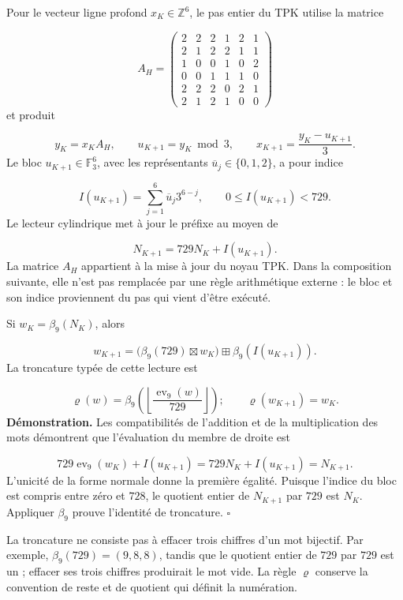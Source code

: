 Pour le vecteur ligne profond \(x_K\in\mathbb Z^6\), le pas entier du TPK utilise la matrice

\[
A_H=
\begin{pmatrix}
2&2&2&1&2&1\\
2&1&2&2&1&1\\
1&0&0&1&0&2\\
0&0&1&1&1&0\\
2&2&2&0&2&1\\
2&1&2&1&0&0
\end{pmatrix}
\]
et produit

\[
y_K=x_KA_H,\qquad
u_{K+1}=y_K\bmod3,\qquad
x_{K+1}=\frac{y_K-u_{K+1}}3.
\]
Le bloc \(u_{K+1}\in\mathbb F_3^6\), avec les représentants \(\overline u_j\in\{0,1,2\}\), a pour indice

\[
I(u_{K+1})=\sum_{j=1}^{6}\overline u_j3^{6-j},
\qquad 0\leq I(u_{K+1})<729.
\]
Le lecteur cylindrique met à jour le préfixe au moyen de

\[
N_{K+1}=729N_K+I(u_{K+1}).
\]
La matrice \(A_H\) appartient à la mise à jour du noyau TPK. Dans la composition suivante, elle n'est pas remplacée par une règle arithmétique externe : le bloc et son indice proviennent du pas qui vient d'être exécuté.

Si \(w_K=\beta_9(N_K)\), alors

\[
w_{K+1}
=\bigl(\beta_9(729)\boxtimes w_K\bigr)
\boxplus\beta_9(I(u_{K+1})).
\]
La troncature typée de cette lecture est

\[
\varrho(w)=
\beta_9\!\left(
\left\lfloor\frac{\operatorname{ev}_9(w)}{729}\right\rfloor
\right);
\qquad \varrho(w_{K+1})=w_K.
\]
\textbf{Démonstration.} Les compatibilités de l'addition et de la multiplication des mots démontrent que l'évaluation du membre de droite est

\[
729\operatorname{ev}_9(w_K)+I(u_{K+1})
=729N_K+I(u_{K+1})=N_{K+1}.
\]
L'unicité de la forme normale donne la première égalité. Puisque l'indice du bloc est compris entre zéro et \(728\), le quotient entier de \(N_{K+1}\) par \(729\) est \(N_K\). Appliquer \(\beta_9\) prouve l'identité de troncature. \hfill\(\square\)

La troncature ne consiste pas à effacer trois chiffres d’un mot bijectif. Par exemple, \(\beta_9(729)=(9,8,8)\), tandis que le quotient entier de \(729\) par \(729\) est un ; effacer ses trois chiffres produirait le mot vide. La règle \(\varrho\) conserve la convention de reste et de quotient qui définit la numération.

